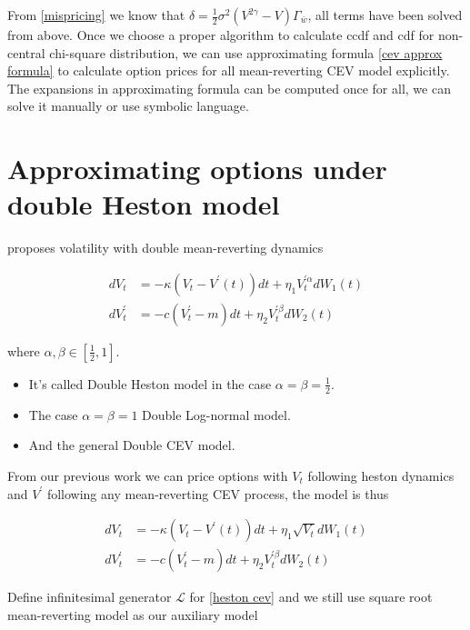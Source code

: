 From \eqref{mispricing} we know that $\delta = \frac{1}{2} \sigma^2 (V^{2\gamma}-V) \Gamma_{\bar{w}}$, all terms have been solved from above. Once we choose a proper algorithm to calculate ccdf and cdf for non-central chi-square distribution,  we can use approximating formula \ref{cev approx formula} to calculate option prices for all mean-reverting CEV model explicitly. The expansions in approximating formula can be computed once for all, we can solve it manually or use symbolic language.

\section{Approximating options under double Heston model}

\cite{gatheral_consistent_nodate} proposes volatility with double mean-reverting dynamics

$$
    \begin{aligned}
        d V_t &=-\kappa\left(V_t-V^{\prime}(t)\right) d t+\eta_{1} V^{\prime \alpha}_t  d W_1(t) \\
        d V^{\prime}_t &=-c\left(V^{\prime}_t-m\right) d t+\eta_{2} V^{\prime \beta}_t d W_{2}(t)
    \end{aligned}
$$

\noindent where $\alpha, \beta \in [\frac{1}{2},1]$.

\begin{itemize}
    \item It's called Double Heston model in the case $\alpha=\beta=\frac{1}{2}$.
    \item The case $\alpha=\beta=1$ Double Log-normal model.
    \item And the general Double CEV model.
\end{itemize}

From our previous work we can price options with $V_t$ following heston dynamics and $V^{\prime}$ following any mean-reverting CEV process, the model is thus

\begin{equation}\label{heston cev}
    \begin{aligned}
        d V_t &=-\kappa\left(V_t-V^{\prime}(t)\right) d t+\eta_{1} \sqrt{V_t} d W_1(t) \\
        d V^{\prime}_t &=-c\left(V^{\prime}_t-m\right) d t+\eta_{2} V^{\prime \beta}_t d W_{2}(t)
    \end{aligned}
\end{equation}

Define infinitesimal generator $\mathcal{L}$ for \eqref{heston cev} and we still use square root mean-reverting model as our auxiliary model

